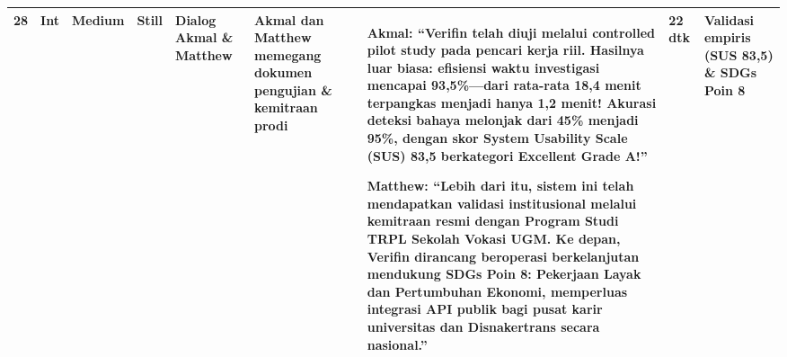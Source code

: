 \documentclass[a4paper,landscape,10pt]{article}
\begin{document}
\begin{longtable}{|C{1.3cm}|C{1.2cm}|L{1.8cm}|L{1.6cm}|L{1.9cm}|L{3.8cm}|L{8.8cm}|C{1.2cm}|L{3.2cm}|}
28 & Int & Medium & Still & Dialog Akmal \& Matthew & Akmal dan Matthew memegang dokumen pengujian \& kemitraan prodi & \textbf{Akmal}: ``Verifin telah diuji melalui controlled pilot study pada pencari kerja riil. Hasilnya luar biasa: efisiensi waktu investigasi mencapai 93,5\%---dari rata-rata 18,4 menit terpangkas menjadi hanya 1,2 menit! Akurasi deteksi bahaya melonjak dari 45\% menjadi 95\%, dengan skor System Usability Scale (SUS) 83,5 berkategori Excellent Grade A!'' \par\vspace{2pt} \textbf{Matthew}: ``Lebih dari itu, sistem ini telah mendapatkan validasi institusional melalui kemitraan resmi dengan Program Studi TRPL Sekolah Vokasi UGM. Ke depan, Verifin dirancang beroperasi berkelanjutan mendukung SDGs Poin 8: Pekerjaan Layak dan Pertumbuhan Ekonomi, memperluas integrasi API publik bagi pusat karir universitas dan Disnakertrans secara nasional.'' & 22 dtk & Validasi empiris (SUS 83,5) \& SDGs Poin 8 \\
\hline


\end{longtable}
\end{document}
